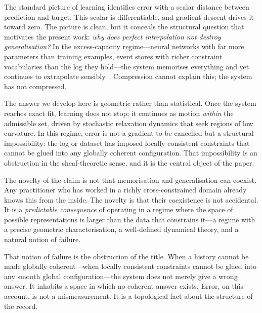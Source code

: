 \documentclass[12pt,oneside]{article}
\theoremstyle{plain}
\theoremstyle{definition}
\theoremstyle{remark}
\begin{document}
The standard picture of learning identifies error with a scalar distance between
prediction and target. This scalar is differentiable, and gradient descent drives
it toward zero. The picture is clean, but it conceals the structural question
that motivates the present work: \emph{why does perfect interpolation not destroy
generalisation?} In the excess-capacity regime---neural networks with far more
parameters than training examples, event stores with richer constraint
vocabularies than the log they hold---the system memorises everything and yet
continues to extrapolate sensibly~\cite{Zhang2017,Belkin2019,DubovaSloman2026}.
Compression cannot explain this; the system has not compressed.

The answer we develop here is geometric rather than statistical. Once the system
reaches exact fit, learning does not stop; it continues as motion \emph{within}
the admissible set, driven by stochastic relaxation dynamics that seek regions of
low curvature. In this regime, error is not a gradient to be cancelled but a
structural impossibility: the log or dataset has imposed locally consistent
constraints that cannot be glued into any globally coherent configuration. That
impossibility is an obstruction in the sheaf-theoretic sense, and it is the
central object of the paper.

The novelty of the claim is not that memorisation and generalisation can coexist.
Any practitioner who has worked in a richly cross-constrained domain already
knows this from the inside. The novelty is that their coexistence is not
accidental. It is a \emph{predictable consequence} of operating in a regime where
the space of possible representations is larger than the data that constrains
it---a regime with a precise geometric characterisation, a well-defined dynamical
theory, and a natural notion of failure.

That notion of failure is the obstruction of the title. When a history cannot be
made globally coherent---when locally consistent constraints cannot be glued into
any smooth global configuration---the system does not merely give a wrong answer.
It inhabits a space in which no coherent answer exists. Error, on this account,
is not a mismeasurement. It is a topological fact about the structure of the
record.
\end{document}
